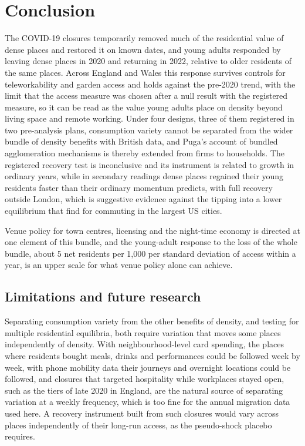 \documentclass[11pt,a4paper]{article}
\begin{document}
\section{Conclusion}\label{sec:conclusion}

The COVID-19 closures temporarily removed much of the residential value of dense places and restored it on known dates, and young adults responded by leaving dense places in 2020 and returning in 2022, relative to older residents of the same places. Across England and Wales this response survives controls for teleworkability and garden access and holds against the pre-2020 trend, with the limit that the access measure was chosen after a null result with the registered measure, so it can be read as the value young adults place on density beyond living space and remote working. Under four designs, three of them registered in two pre-analysis plans, consumption variety cannot be separated from the wider bundle of density benefits with British data, and Puga's account of bundled agglomeration mechanisms is thereby extended from firms to households. The registered recovery test is inconclusive and its instrument is related to growth in ordinary years, while in secondary readings dense places regained their young residents faster than their ordinary momentum predicts, with full recovery outside London, which is suggestive evidence against the tipping into a lower equilibrium that \citet{monte2026} find for commuting in the largest US cities.

Venue policy for town centres, licensing and the night-time economy is directed at one element of this bundle, and the young-adult response to the loss of the whole bundle, about 5 net residents per 1,000 per standard deviation of access within a year, is an upper scale for what venue policy alone can achieve.

\subsection{Limitations and future research}\label{sec:limits}

Separating consumption variety from the other benefits of density, and testing for multiple residential equilibria, both require variation that moves some places independently of density. With neighbourhood-level card spending, the places where residents bought meals, drinks and performances could be followed week by week, with phone mobility data their journeys and overnight locations could be followed, and closures that targeted hospitality while workplaces stayed open, such as the tiers of late 2020 in England, are the natural source of separating variation at a weekly frequency, which is too fine for the annual migration data used here. A recovery instrument built from such closures would vary across places independently of their long-run access, as the pseudo-shock placebo requires.
\end{document}

